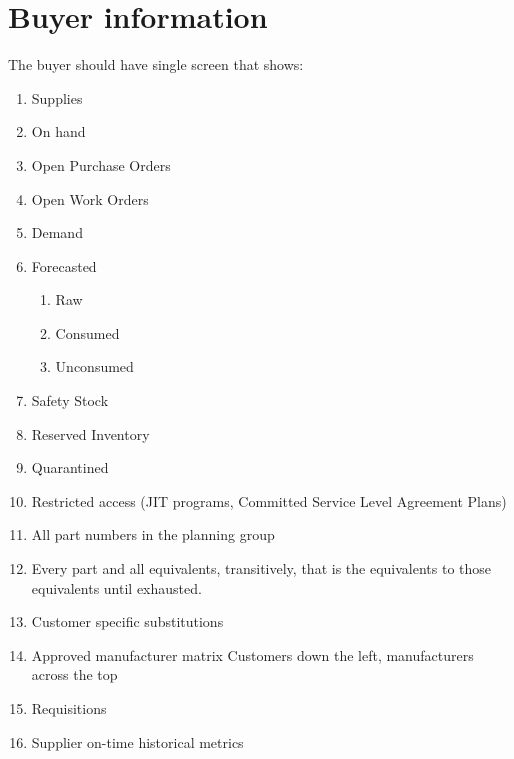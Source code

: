 \documentclass[letterpaper,10pt,english]{sphinxmanual}
\begin{document}
\section{Buyer information}
\label{FutureState:buyer-information}
The buyer should have single screen that shows:
\begin{enumerate}
\item {} 
Supplies

\item {} 
On hand

\item {} 
Open Purchase Orders

\item {} 
Open Work Orders

\item {} 
Demand

\item {} 
Forecasted
\begin{enumerate}
\item {} 
Raw

\item {} 
Consumed

\item {} 
Unconsumed

\end{enumerate}

\item {} 
Safety Stock

\item {} 
Reserved Inventory

\item {} 
Quarantined

\item {} 
Restricted access (JIT programs, Committed Service Level Agreement
Plans)

\item {} 
All part numbers in the planning group

\item {} 
Every part and all equivalents, transitively, that is the equivalents
to those equivalents until exhausted.

\item {} 
Customer specific substitutions

\item {} 
Approved manufacturer matrix Customers down the left, manufacturers
across the top

\item {} 
Requisitions

\item {} 
Supplier on-time historical metrics


\end{enumerate}
\end{document}
